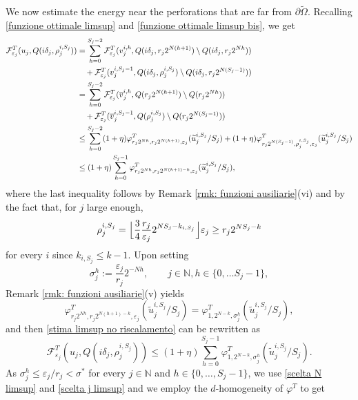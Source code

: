 \documentclass{article}
\theoremstyle{plain}
\theoremstyle{definition}
\def\NN{{\mathbb N}}
\newcommand{\f}{\varphi}
\newcommand{\ej}{\varepsilon_j}
\newcommand{\rj}{r_j}
\newcommand{\s}{\sigma}
\newcommand{\sj}{\sigma_j}
\newcommand{\dej}{\delta_j}
\newcommand{\F}{\mathcal{F}}
\numberwithin{equation}{section}
\begin{document}
We now estimate the energy near the perforations that are far from $\partial \widetilde{\Omega}$. Recalling \eqref{funzione ottimale limsup} and \eqref{funzione ottimale limsup bis}, we get
\begin{align} \notag
    \F^T_{\ej}(u_j, Q(i\dej,\rho_j^{i,S_j})) & =  \sum_{h=0}^{S_j-2} \F^T_{\ej}(v_j^{i,h},  Q(i\dej,\rj 2^{N(h+1)})\setminus Q(i\dej,\rj 2^{Nh})) \\ \notag 
    & \quad+ \F^T_{\ej}(v_j^{i,S_j-1},  Q(i\dej,\rho_j^{i,S_j})\setminus Q(i\dej, \rj2^{N(S_j-1)})) \\ \notag
    & =  \sum_{h=0}^{S_j-2} \F_{\ej}^T(\overline{v}^{i,h}_j,  Q(\rj 2^{N(h+1)})\setminus Q(\rj 2^{Nh})) \\ \notag
    & \quad +  \F_{\ej}^T(\overline{v}^{i,S_j-1}_j, Q(\rho_j^{i,S_j})\setminus Q(\rj2^{N(S_j-1)}))\\ \notag
    &  \leq \sum_{h=0}^{S_j-2} (1+\eta)\f^T_{\rj2^{Nh},\rj2^{N(h+1)}, \ej}(\widetilde{u}^{i,S_j}_j/S_j) + (1+\eta)\f^T_{\rj2^{N(S_j-1)},\rho^{i,S_j}_j, \ej}(\widetilde{u}^{i,S_j}_j/S_j) \\ \label{stima limsup no riscalamento}
    & \leq (1+\eta)\sum_{h=0}^{S_j-1} \f^T_{\rj2^{Nh},r_j2^{N(h+1)-k}, \ej}(\widetilde{u}^{i,S_j}_j/S_j),
\end{align}
where the last inequality follows by Remark \ref{rmk: funzioni ausiliarie}(vi) and by the fact that, for $j$ large enough, 
\begin{equation*}
    \rho_j^{i,S_j} = \Bigl\lfloor\frac{3}{4}\frac{\rj}{\varepsilon_{j}}2^{NS_j-k_{i,S_j}}\Bigr\rfloor\varepsilon_{j} \geq \rj2^{NS_j-k}
\end{equation*}
for every $i$ since $k_{i,S_j}\leq k-1$. Upon setting 
\begin{equation*}
    \sj^h:=\frac{\ej}{\rj}2^{-Nh}, \qquad j\in\NN, h\in\{0,\dots S_j-1\},
\end{equation*}
Remark \ref{rmk: funzioni ausiliarie}(v) yields
\begin{equation*}
    \f^T_{\rj2^{Nh},\rj2^{N(h+1)-k}, \ej}(\widetilde{u}^{i,S_j}_j/S_j)=\f^T_{1,2^{N-k}, \sj^h}(\widetilde{u}^{i,S_j}_j/S_j),
\end{equation*}
and then \eqref{stima limsup no riscalamento} can be rewritten as
\begin{equation*}
    \F^T_{\ej}(u_j, Q(i\dej,\rho_j^{i,S_j})) \leq (1+\eta)\sum_{h=0}^{S_j-1}\f^T_{1,2^{N-k}, \sj^h}(\widetilde{u}^{i,S_j}_j/S_j).
\end{equation*}
As $\sj^h\leq\ej/\rj<\s^*$ for every $j\in\NN$ and $h\in\{0,\dots,S_j-1\}$, we use \eqref{scelta N limsup} and \eqref{scelta j limsup} and we employ the $d$-homogeneity of $\f^T$ to get 
\end{document}
